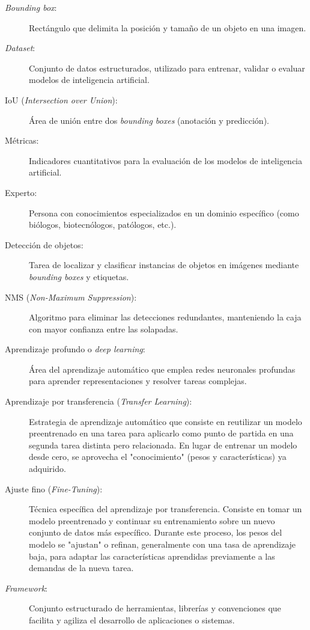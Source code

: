 \documentclass[12pt,a4paper,onecolumn,oneside]{report}
\begin{document}
\begin{description}
  \item[\textit{Bounding box}:] Rectángulo que delimita la posición y tamaño de un objeto en una imagen.
  \item[\textit{Dataset}:] Conjunto de datos estructurados, utilizado para entrenar, validar o evaluar modelos de inteligencia artificial.
  \item[IoU (\textit{Intersection over Union}):] Área de unión entre dos \textit{bounding boxes} (anotación y predicción).
  \item[Métricas:] Indicadores cuantitativos para la evaluación de los modelos de inteligencia artificial.
  \item[Experto:] Persona con conocimientos especializados en un dominio específico (como biólogos, biotecnólogos, patólogos, etc.).
  \item[Detección de objetos:] Tarea de localizar y clasificar instancias de objetos en imágenes mediante \textit{bounding boxes} y etiquetas. 
  \item[NMS (\textit{Non-Maximum Suppression}):] Algoritmo para eliminar las detecciones redundantes, manteniendo la caja con mayor confianza entre las solapadas.
  \item[Aprendizaje profundo o \textit{deep learning}:] Área del aprendizaje automático que emplea redes neuronales profundas para aprender representaciones y resolver tareas complejas.
  \item[Aprendizaje por transferencia (\textit{Transfer Learning}):] Estrategia de aprendizaje automático que consiste en reutilizar un modelo preentrenado en una tarea para aplicarlo como punto de partida en una segunda 
  tarea distinta pero relacionada. En lugar de entrenar un modelo desde cero, se aprovecha el "conocimiento" (pesos y características) ya adquirido.
  \item[Ajuste fino (\textit{Fine-Tuning}):] Técnica específica del aprendizaje por transferencia. Consiste en tomar un modelo preentrenado y continuar su entrenamiento sobre un nuevo conjunto de datos más específico. 
  Durante este proceso, los pesos del modelo se "ajustan" o refinan, generalmente con una tasa de aprendizaje baja, para adaptar las características aprendidas previamente a las demandas de la nueva tarea.
  \item[\textit{Framework}:] Conjunto estructurado de herramientas, librerías y convenciones que facilita y agiliza el desarrollo de aplicaciones o sistemas.

\end{description}
\end{document}
